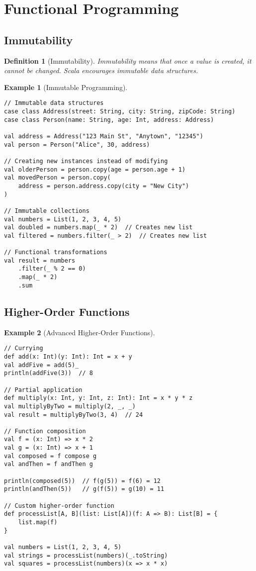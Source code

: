 \documentclass[11pt]{article}
\newtheorem{definition}{Definition}[section]
\newtheorem{example}{Example}[section]
\begin{document}
\section{Functional Programming}

\subsection{Immutability}

\begin{definition}[Immutability]
Immutability means that once a value is created, it cannot be changed. Scala encourages immutable data structures.
\end{definition}

\begin{example}[Immutable Programming]
\begin{lstlisting}
// Immutable data structures
case class Address(street: String, city: String, zipCode: String)
case class Person(name: String, age: Int, address: Address)

val address = Address("123 Main St", "Anytown", "12345")
val person = Person("Alice", 30, address)

// Creating new instances instead of modifying
val olderPerson = person.copy(age = person.age + 1)
val movedPerson = person.copy(
    address = person.address.copy(city = "New City")
)

// Immutable collections
val numbers = List(1, 2, 3, 4, 5)
val doubled = numbers.map(_ * 2)  // Creates new list
val filtered = numbers.filter(_ > 2)  // Creates new list

// Functional transformations
val result = numbers
    .filter(_ % 2 == 0)
    .map(_ * 2)
    .sum
\end{lstlisting}
\end{example}

\subsection{Higher-Order Functions}

\begin{example}[Advanced Higher-Order Functions]
\begin{lstlisting}
// Currying
def add(x: Int)(y: Int): Int = x + y
val addFive = add(5)_
println(addFive(3))  // 8

// Partial application
def multiply(x: Int, y: Int, z: Int): Int = x * y * z
val multiplyByTwo = multiply(2, _, _)
val result = multiplyByTwo(3, 4)  // 24

// Function composition
val f = (x: Int) => x * 2
val g = (x: Int) => x + 1
val composed = f compose g
val andThen = f andThen g

println(composed(5))  // f(g(5)) = f(6) = 12
println(andThen(5))   // g(f(5)) = g(10) = 11

// Custom higher-order function
def processList[A, B](list: List[A])(f: A => B): List[B] = {
    list.map(f)
}

val numbers = List(1, 2, 3, 4, 5)
val strings = processList(numbers)(_.toString)
val squares = processList(numbers)(x => x * x)
\end{lstlisting}
\end{example}
\end{document}
